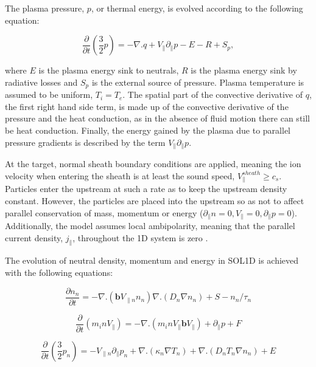 \documentclass[12pt]{article}  %
\begin{document}
The plasma pressure, $ p $, or thermal energy, is evolved according to the following equation: 

  \begin{equation}\label{eqPressure}
  \frac{\partial}{\partial t}\left( \frac{3}{2}p\right)  = -\nabla.q + V_{\parallel} \partial_{\parallel}p -E - R + S_p,
  \end{equation}

where $ E $ is the plasma energy sink to neutrals, $ R $ is the plasma energy sink by radiative losses and $ S_p $ is the external source of pressure. Plasma temperature is assumed to be uniform, $ T_i = T_e $. The spatial part of the convective derivative of $q$, the first right hand side term, is made up of the convective derivative of the pressure and the heat conduction, as in the absence of fluid motion there can still be heat conduction. Finally, the energy gained by the plasma due to parallel pressure gradients is described by the term $V_{\parallel} \partial_{\parallel}p$.


At the target, normal sheath boundary conditions are applied, meaning the ion velocity when entering the sheath is at least the sound speed, $ V_{\parallel}^{sheath} \geq c_s$. Particles enter the upstream at such a rate as to keep the upstream density constant. However, the particles are placed into the upstream so as not to affect parallel conservation of mass, momentum or energy ($ \partial_{\parallel}n =0, V_{\parallel} =0, \partial_{\parallel}p =0 $). Additionally, the model assumes local ambipolarity, meaning that the parallel current density, $j_{\parallel}$, throughout the 1D system is zero \cite{Stangeby}. 

The evolution of neutral density, momentum and energy in SOL1D is achieved with the following equations:

  \begin{equation}\label{eqNdensity}
  \frac{\partial n_n}{\partial t} = -\nabla.(\textbf{b} V_{\parallel n} n_n) \nabla.(D_n \nabla n_n) + S - n_n/\tau_n
  \end{equation}
  
  \begin{equation}\label{eqNmom}
  \frac{\partial}{\partial t}(m_i n V_{\parallel}) = -\nabla . (m_i n V_{\parallel} \textbf{b} V_{\parallel}) + \partial_{\parallel}p + F
  \end{equation}
  
  \begin{equation}\label{eqNpress}
  \frac{\partial}{\partial t}\left( \frac{3}{2}p_n\right)  = -V_{\parallel n} \partial_{\parallel}p_n + \nabla.(\kappa_n \nabla T_n) + \nabla.(D_n T_n \nabla n_n)+ E
  \end{equation}
  
\end{document}

